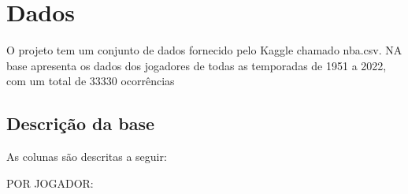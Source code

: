\documentclass[
]{book}
\begin{document}
\hypertarget{dados}{%
\chapter{Dados}\label{dados}}

O projeto tem um conjunto de dados fornecido pelo Kaggle chamado nba.csv. NA base apresenta os dados dos jogadores de todas as temporadas de 1951 a 2022, com um total de 33330 ocorrências

\hypertarget{descriuxe7uxe3o-da-base}{%
\section{Descrição da base}\label{descriuxe7uxe3o-da-base}}

As colunas são descritas a seguir:

POR JOGADOR:
\end{document}
